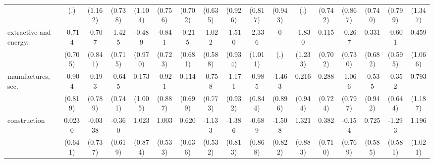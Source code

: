 {\begin{tabular}{l*{16}{c}}
                    &         (.)         &     (1.162)         &     (0.738)         &     (1.104)         &     (0.756)         &     (0.702)         &     (0.635)         &     (0.926)         &     (0.817)         &     (0.943)         &         (.)         &     (0.742)         &     (0.867)         &     (0.740)         &     (0.799)         &     (1.347)         \\
[1em]
extractive and energy.&      -0.714         &      -0.707         &      -1.425\sym{*}  &      -0.489         &      -0.841         &      -0.215         &      -1.022         &      -1.510         &      -2.336\sym{*}  &           0         &      -1.830         &       0.115         &      -0.267         &       0.331         &      -0.601         &       0.459         \\
                    &     (0.705)         &     (0.841)         &     (0.715)         &     (0.970)         &     (0.723)         &     (0.681)         &     (0.588)         &     (0.934)         &     (1.011)         &         (.)         &     (1.233)         &     (0.702)         &     (0.730)         &     (0.682)         &     (0.595)         &     (1.066)         \\
[1em]
manufactures, sec.  &      -0.904         &      -0.193         &      -0.645         &       0.173         &      -0.921         &       0.114         &      -0.758         &      -1.171         &      -0.985         &      -1.463         &       0.216         &       0.288         &      -1.066         &      -0.535         &      -0.352         &       0.793         \\
                    &     (0.819)         &     (0.789)         &     (0.741)         &     (1.005)         &     (0.887)         &     (0.699)         &     (0.773)         &     (0.932)         &     (0.844)         &     (0.896)         &     (0.944)         &     (0.724)         &     (0.797)         &     (0.942)         &     (0.644)         &     (1.187)         \\
[1em]
construction        &      0.0230         &     -0.0338         &      -0.360         &       1.023         &       1.003         &       0.620         &      -1.133\sym{*}  &      -1.386         &      -0.689         &      -1.508         &       1.321         &       0.382         &      -0.154         &       0.725         &      -1.293\sym{*}  &       1.196         \\
                    &     (0.641)         &     (0.737)         &     (0.619)         &     (0.874)         &     (0.533)         &     (0.636)         &     (0.532)         &     (0.813)         &     (0.868)         &     (0.822)         &     (0.883)         &     (0.710)         &     (0.769)         &     (0.585)         &     (0.581)         &     (1.021)         \\

\end{tabular}}
